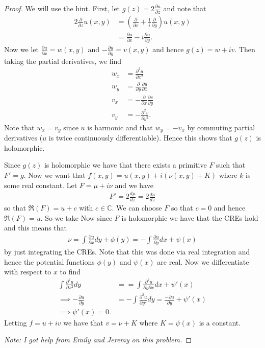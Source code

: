 \documentclass[leqno]{article}
\theoremstyle{nonumberplain}
\newtheorem{proof}{Proof}
\newcommand{\C}{\mathbb{C}}
\begin{document}
\begin{proof}
We will use the hint.  First, let $g(z)=2\frac{\partial u}{\partial z}$ and note that
\begin{align*}
2\frac{\partial}{\partial z} u(x,y)&=\left( \frac{\partial}{\partial x}+\frac{1}{i}\frac{\partial}{\partial y} \right) u(x,y)\\
&= \frac{\partial u}{\partial x}-i\frac{\partial u}{\partial y}.
\end{align*}
Now we let $\frac{\partial u}{\partial x}=w(x,y)$ and $-\frac{\partial u}{\partial y}=v(x,y)$ and hence $g(z)=w+iv$. Then taking the partial derivatives, we find
\begin{align*}
w_x &=\frac{\partial^2 u}{\partial x^2}\\
w_y &= \frac{\partial}{\partial y} \frac{\partial u}{\partial x}\\
v_x &= -\frac{\partial}{\partial x}\frac{\partial v}{\partial y}\\
v_y &= -\frac{\partial^2 v}{\partial y^2}.
\end{align*}
Note that $w_x=v_y$ since $u$ is harmonic and that $w_y=-v_x$ by commuting partial derivatives ($u$ is twice continuously differentiable). Hence this shows that $g(z)$ is holomorphic.

Since $g(z)$ is holomorphic we have that there exists a primitive $F$ such that $F'=g$.  Now we want that $f(x,y)=u(x,y)+i(\nu(x,y)+K)$ where $k$ is some real constant. Let $F=\mu +i \nu$ and we have
\begin{align*}
F'=2\frac{d\mu}{dz}=2\frac{du}{dz}
\end{align*} 
so that $\Re(F)=u+c$ with $c\in \C$. We can choose $F$ so that $c=0$ and hence $\Re(F)=u$. So we take Now since $F$ is holomorphic we have that the CREs hold and this means that 
\begin{align*}
\nu= \int \frac{\partial u}{\partial x}dy + \phi(y)=-\int \frac{\partial u}{\partial y}dx + \psi(x)
\end{align*}
by just integrating the CREs. Note that this was done via real integration and hence the potential functions $\phi(y)$ and $\psi(x)$ are real. Now we differentiate with respect to $x$ to find
\begin{align*}
\int \frac{\partial^2 u}{\partial x^2}dy &= =\int \frac{\partial^2 u}{\partial y \partial x} dx + \psi'(x)\\
\implies -\frac{\partial u}{\partial y} &= -\int \frac{\partial^2 u}{\partial y^2}dy = \frac{-\partial u}{\partial y}+\psi'(x)\\
\implies \psi'(x)=0.
\end{align*}
Letting $f=u+iv$ we have that $v=\nu + K$ where $K=\psi(x)$ is a constant.

\noindent \emph{Note: I got help from Emily and Jeremy on this problem.}
\end{proof}
\end{document}
